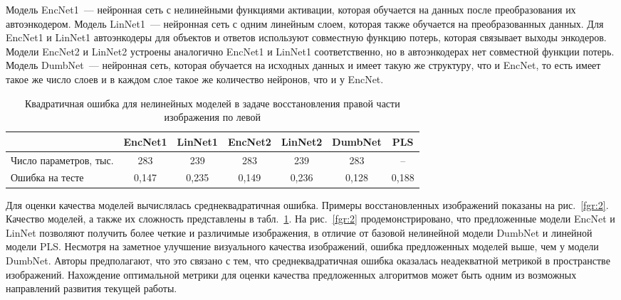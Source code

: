 \documentclass[12pt]{article}
\begin{document}
Модель EncNet1~--- нейронная сеть с нелинейными функциями активации, которая обучается на данных после преобразования их автоэнкодером. Модель LinNet1~--- нейронная сеть с одним линейным слоем, которая также обучается на преобразованных данных. Для EncNet1 и LinNet1 автоэнкодеры для объектов и ответов используют совместную функцию потерь, которая связывает выходы энкодеров. Модели EncNet2 и LinNet2 устроены аналогично EncNet1 и LinNet1 соответственно, но в автоэнкодерах нет совместной функции потерь. Модель DumbNet~---  нейронная сеть, которая обучается на исходных данных и имеет такую же структуру, что и EncNet, то есть имеет такое же число слоев и в каждом слое такое же количество нейронов, что и у EncNet.

\begin{table}[!bp]
\caption{Квадратичная ошибка для нелинейных моделей в задаче восстановления правой части изображения по левой}
\centering
\begin{tabular}{l|cccccc}
\hline
	& EncNet1 & LinNet1 & EncNet2 & LinNet2 & DumbNet & PLS\\  \hline
	Число параметров, тыс. & 283 & 239 & 283 & 239  & 283 & --\\ 
	Ошибка на тесте & 0,147 & 0,235 & 0,149 & 0,236 & 0,128 & 0,188 \\ 
	\hline
\end{tabular}
\label{tbl:2}
\end{table}

Для оценки качества моделей вычислялась среднеквадратичная ошибка. Примеры восстановленных изображений показаны на рис.~\ref{fgr:2}. Качество моделей, а также их сложность представлены в табл.~\ref{tbl:2}. 
На рис.~\ref{fgr:2} продемонстрировано, что предложенные модели EncNet и LinNet позволяют получить более четкие и различимые изображения, в отличие от базовой нелинейной модели DumbNet и линейной модели PLS.
Несмотря на заметное улучшение визуального качества изображений, ошибка предложенных моделей выше, чем у модели DumbNet. 
Авторы предполагают, что это связано с тем, что среднеквадратичная ошибка оказалась неадекватной метрикой в пространстве изображений.
Нахождение оптимальной метрики для оценки качества предложенных алгоритмов может быть одним из возможных направлений развития текущей работы.
\end{document}
